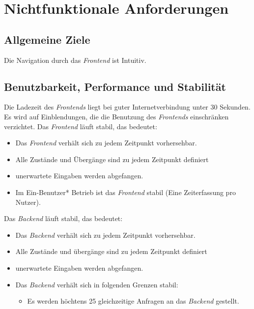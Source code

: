\section{Nichtfunktionale Anforderungen}

\subsection{Allgemeine Ziele}
\begin{requirements}
     Die Navigation durch das \emph{Frontend} ist Intuitiv.
\end{requirements}

\subsection{Benutzbarkeit, Performance und Stabilität}
\begin{requirements}
     Die Ladezeit des \emph{Frontends} liegt bei guter Internetverbindung unter 30 Sekunden.
     Es wird auf Einblendungen, die die Benutzung des \emph{Frontends} einschränken verzichtet.
     Das \emph{Frontend} läuft stabil, das bedeutet:
     \begin{itemize}
        \item Das \emph{Frontend} verhält sich zu jedem Zeitpunkt vorhersehbar.
        \item Alle Zustände und Übergänge sind zu jedem Zeitpunkt definiert
        \item unerwartete Eingaben werden abgefangen.
        \item Im Ein-Benutzer* Betrieb ist das \emph{Frontend} stabil (Eine Zeiterfassung pro Nutzer).
     \end{itemize}
      Das \emph{Backend} läuft stabil, das bedeutet:
          \begin{itemize}
             \item Das \emph{Backend} verhält sich zu jedem Zeitpunkt vorhersehbar.
             \item Alle Zustände und übergänge sind zu jedem Zeitpunkt definiert
             \item unerwartete Eingaben werden abgefangen.
             \item Das \emph{Backend} verhält sich in folgenden Grenzen stabil:
             \begin{itemize}
                 \item Es werden höchtens 25 gleichzeitige Anfragen an das \emph{Backend} gestellt.
             \end{itemize}
          \end{itemize}
\end{requirements}


